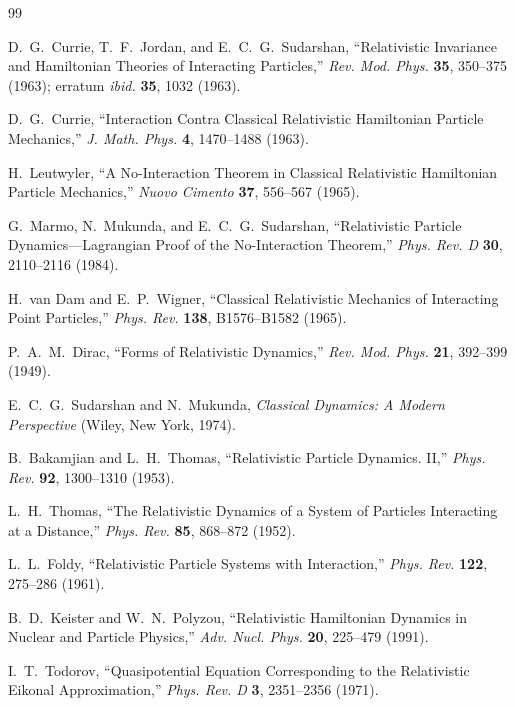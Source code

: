 \documentclass[11pt]{article}
\begin{document}
\begin{thebibliography}{99}

 D.~G.~Currie, T.~F.~Jordan, and E.~C.~G.~Sudarshan, ``Relativistic Invariance and Hamiltonian Theories of Interacting Particles,'' \textit{Rev. Mod. Phys.} \textbf{35}, 350--375 (1963); erratum \textit{ibid.} \textbf{35}, 1032 (1963).

 D.~G.~Currie, ``Interaction Contra Classical Relativistic Hamiltonian Particle Mechanics,'' \textit{J. Math. Phys.} \textbf{4}, 1470--1488 (1963).

 H.~Leutwyler, ``A No-Interaction Theorem in Classical Relativistic Hamiltonian Particle Mechanics,'' \textit{Nuovo Cimento} \textbf{37}, 556--567 (1965).

 G.~Marmo, N.~Mukunda, and E.~C.~G.~Sudarshan, ``Relativistic Particle Dynamics---Lagrangian Proof of the No-Interaction Theorem,'' \textit{Phys. Rev. D} \textbf{30}, 2110--2116 (1984).

 H.~van Dam and E.~P.~Wigner, ``Classical Relativistic Mechanics of Interacting Point Particles,'' \textit{Phys. Rev.} \textbf{138}, B1576--B1582 (1965).

 P.~A.~M.~Dirac, ``Forms of Relativistic Dynamics,'' \textit{Rev. Mod. Phys.} \textbf{21}, 392--399 (1949).

 E.~C.~G.~Sudarshan and N.~Mukunda, \textit{Classical Dynamics: A Modern Perspective} (Wiley, New York, 1974).

 B.~Bakamjian and L.~H.~Thomas, ``Relativistic Particle Dynamics. II,'' \textit{Phys. Rev.} \textbf{92}, 1300--1310 (1953).

 L.~H.~Thomas, ``The Relativistic Dynamics of a System of Particles Interacting at a Distance,'' \textit{Phys. Rev.} \textbf{85}, 868--872 (1952).

 L.~L.~Foldy, ``Relativistic Particle Systems with Interaction,'' \textit{Phys. Rev.} \textbf{122}, 275--286 (1961).

 B.~D.~Keister and W.~N.~Polyzou, ``Relativistic Hamiltonian Dynamics in Nuclear and Particle Physics,'' \textit{Adv. Nucl. Phys.} \textbf{20}, 225--479 (1991).

 I.~T.~Todorov, ``Quasipotential Equation Corresponding to the Relativistic Eikonal Approximation,'' \textit{Phys. Rev. D} \textbf{3}, 2351--2356 (1971).


\end{thebibliography}
\end{document}
